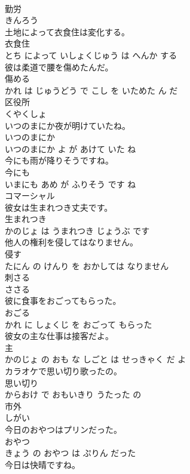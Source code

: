 \documentclass[8pt]{extreport}
\begin{document}
\begin{CJK}{UTF8}{min}
\\	勤労	
\\	きんろう		
\\	土地によって衣食住は変化する。	
\\	衣食住 
\\	とち によって いしょくじゅう は へんか する			
\\	彼は柔道で腰を傷めたんだ。	
\\	傷める 
\\	かれ は じゅうどう で こし を いためた ん だ			
\\	区役所	
\\	くやくしょ		
\\	いつのまにか夜が明けていたね。	
\\	いつのまにか 
\\	いつのまにか よ が あけて いた ね			
\\	今にも雨が降りそうですね。	
\\	今にも 
\\	いまにも あめ が ふりそう です ね			
\\	コマーシャル	
\\	彼女は生まれつき丈夫です。	
\\	生まれつき 
\\	かのじょ は うまれつき じょうぶ です			
\\	他人の権利を侵してはなりません。	
\\	侵す 
\\	たにん の けんり を おかしては なりません			
\\	刺さる	
\\	ささる		
\\	彼に食事をおごってもらった。	
\\	おごる 
\\	かれ に しょくじ を おごって もらった			
\\	彼女の主な仕事は接客だよ。	
\\	主 
\\	かのじょ の おも な しごと は せっきゃく だ よ			
\\	カラオケで思い切り歌ったの。	
\\	思い切り 
\\	からおけ で おもいきり うたった の			
\\	市外	
\\	しがい		
\\	今日のおやつはプリンだった。	
\\	おやつ 
\\	きょう の おやつ は ぷりん だった			
\\	今日は快晴ですね。	

\end{CJK}
\end{document}
